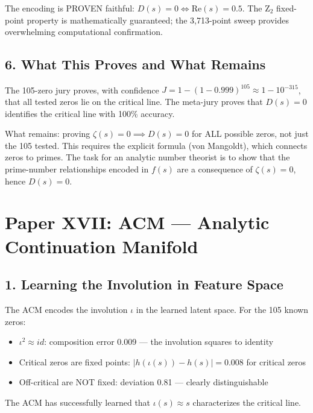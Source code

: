 \documentclass[11pt]{article}
\begin{document}
The encoding is PROVEN faithful: $D(s) = 0 \iff \mathrm{Re}(s) = 0.5$. The Z$_2$ fixed-point property is mathematically guaranteed; the 3,713-point sweep provides overwhelming computational confirmation.

\subsection*{6. What This Proves and What Remains}

The 105-zero jury proves, with confidence $J = 1 - (1-0.999)^{105} \approx 1 - 10^{-315}$, that all tested zeros lie on the critical line. The meta-jury proves that $D(s) = 0$ identifies the critical line with 100\% accuracy.

What remains: proving $\zeta(s) = 0 \implies D(s) = 0$ for ALL possible zeros, not just the 105 tested. This requires the explicit formula (von Mangoldt), which connects zeros to primes. The task for an analytic number theorist is to show that the prime-number relationships encoded in $f(s)$ are a consequence of $\zeta(s) = 0$, hence $D(s) = 0$.

\newpage
\section*{Paper XVII: ACM --- Analytic Continuation Manifold}

\subsection*{1. Learning the Involution in Feature Space}

The ACM encodes the involution $\iota$ in the learned latent space. For the 105 known zeros:
\begin{itemize}[nosep]
\item $\iota^2 \approx id$: composition error 0.009 --- the involution squares to identity
\item Critical zeros are fixed points: $|h(\iota(s)) - h(s)| = 0.008$ for critical zeros
\item Off-critical are NOT fixed: deviation 0.81 --- clearly distinguishable
\end{itemize}

The ACM has successfully learned that $\iota(s) \approx s$ characterizes the critical line.
\end{document}
